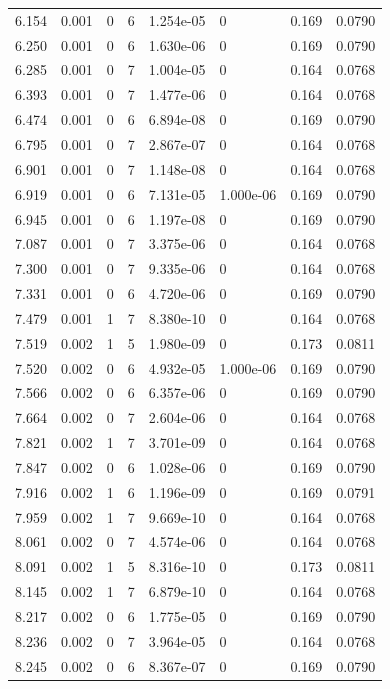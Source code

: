 \documentclass[preview]{standalone}
\begin{document}
{{{\begin{tabular}{L{1.2cm}C{1.2cm} C{0.3cm}C{0.5cm} C{1.4cm}C{1.4cm} C{1.4cm}C{1.4cm}}
  6.154  &  0.001  & 0     &  6 &  1.254e-05  & 0  & 0.169 &  0.0790   \\ 
  6.250  &  0.001  & 0     &  6 &  1.630e-06  & 0  & 0.169 &  0.0790   \\ 
  6.285  &  0.001  & 0     &  7 &  1.004e-05  & 0  & 0.164 &  0.0768   \\ 
  6.393  &  0.001  & 0     &  7 &  1.477e-06  & 0  & 0.164 &  0.0768   \\ 
  6.474  &  0.001  & 0     &  6 &  6.894e-08  & 0  & 0.169 &  0.0790   \\ 
  6.795  &  0.001  & 0     &  7 &  2.867e-07  & 0  & 0.164 &  0.0768   \\ 
  6.901  &  0.001  & 0     &  7 &  1.148e-08  & 0  & 0.164 &  0.0768   \\ 
  6.919  &  0.001  & 0     &  6 &  7.131e-05  & 1.000e-06  & 0.169 &  0.0790   \\ 
  6.945  &  0.001  & 0     &  6 &  1.197e-08  & 0  & 0.169 &  0.0790   \\ 
  7.087  &  0.001  & 0     &  7 &  3.375e-06  & 0  & 0.164 &  0.0768   \\ 
  7.300  &  0.001  & 0     &  7 &  9.335e-06  & 0  & 0.164 &  0.0768   \\ 
  7.331  &  0.001  & 0     &  6 &  4.720e-06  & 0  & 0.169 &  0.0790   \\ 
  7.479  &  0.001  & 1     &  7 &  8.380e-10  & 0  & 0.164 &  0.0768   \\ 
  7.519  &  0.002  & 1     &  5 &  1.980e-09  & 0  & 0.173 &  0.0811   \\ 
  7.520  &  0.002  & 0     &  6 &  4.932e-05  & 1.000e-06  & 0.169 &  0.0790   \\ 
  7.566  &  0.002  & 0     &  6 &  6.357e-06  & 0  & 0.169 &  0.0790   \\ 
  7.664  &  0.002  & 0     &  7 &  2.604e-06  & 0  & 0.164 &  0.0768   \\ 
  7.821  &  0.002  & 1     &  7 &  3.701e-09  & 0  & 0.164 &  0.0768   \\ 
  7.847  &  0.002  & 0     &  6 &  1.028e-06  & 0  & 0.169 &  0.0790   \\ 
  7.916  &  0.002  & 1     &  6 &  1.196e-09  & 0  & 0.169 &  0.0791   \\ 
  7.959  &  0.002  & 1     &  7 &  9.669e-10  & 0  & 0.164 &  0.0768   \\ 
  8.061  &  0.002  & 0     &  7 &  4.574e-06  & 0  & 0.164 &  0.0768   \\ 
  8.091  &  0.002  & 1     &  5 &  8.316e-10  & 0  & 0.173 &  0.0811   \\ 
  8.145  &  0.002  & 1     &  7 &  6.879e-10  & 0  & 0.164 &  0.0768   \\ 
  8.217  &  0.002  & 0     &  6 &  1.775e-05  & 0  & 0.169 &  0.0790   \\ 
  8.236  &  0.002  & 0     &  7 &  3.964e-05  & 0  & 0.164 &  0.0768   \\ 
  8.245  &  0.002  & 0     &  6 &  8.367e-07  & 0  & 0.169 &  0.0790   \\ 
\hline 
\end{tabular} 

}}}
\end{document}
